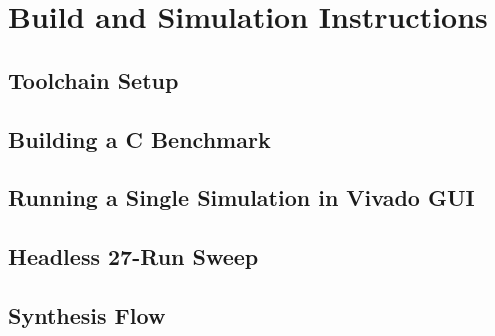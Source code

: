 \chapter{Build and Simulation Instructions}
\label{app:build}

\section{Toolchain Setup}
\section{Building a C Benchmark}
\section{Running a Single Simulation in Vivado GUI}
\section{Headless 27-Run Sweep}
\section{Synthesis Flow}
